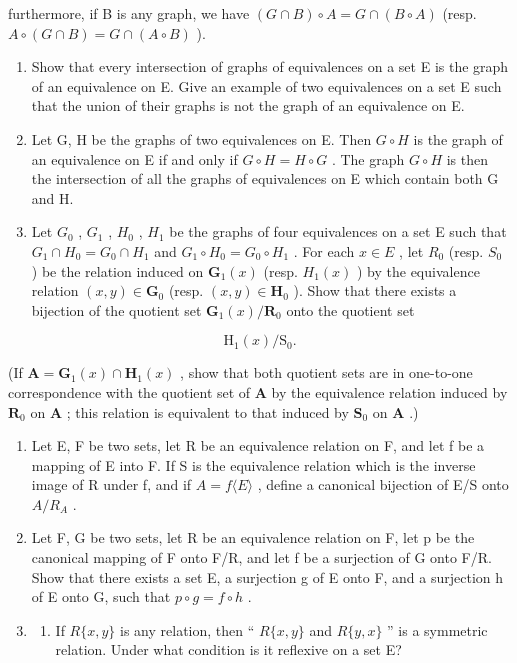 furthermore, if B is any graph, we have \((G \cap B) \circ A = G \cap (B \circ A)\) (resp. \(A \circ (G \cap B) = G \cap (A \circ B)\) ).

\begin{enumerate}
\def\labelenumi{\arabic{enumi}.}
\setcounter{enumi}{4}
\item
  Show that every intersection of graphs of equivalences on a set E is the graph of an equivalence on E. Give an example of two equivalences on a set E such that the union of their graphs is not the graph of an equivalence on E.
\item
  Let G, H be the graphs of two equivalences on E. Then \(G \circ H\) is the graph of an equivalence on E if and only if \(G \circ H = H \circ G\) . The graph \(G \circ H\) is then the intersection of all the graphs of equivalences on E which contain both G and H.
\item
  Let \(G_{0}\) , \(G_{1}\) , \(H_{0}\) , \(H_{1}\) be the graphs of four equivalences on a set E such that \(G_{1} \cap H_{0} = G_{0} \cap H_{1}\) and \(G_{1} \circ H_{0} = G_{0} \circ H_{1}\) . For each \(x \in E\) , let \(R_{0}\) (resp. \(S_{0}\) ) be the relation induced on \(\mathbf{G}_{1}(x)\) (resp. \(H_{1}(x)\) ) by the equivalence relation \((x, y) \in \mathbf{G}_{0}\) (resp. \((x, y) \in \mathbf{H}_{0}\) ). Show that there exists a bijection of the quotient set \(\mathbf{G}_{1}(x)/\mathbf{R}_{0}\) onto the quotient set
\end{enumerate}

\[
\mathrm{H} _ {1} (x) / \mathrm{S} _ {0}.
\]

(If \(\mathbf{A} = \mathbf{G}_1(x) \cap \mathbf{H}_1(x)\) , show that both quotient sets are in one-to-one correspondence with the quotient set of \(\mathbf{A}\) by the equivalence relation induced by \(\mathbf{R}_0\) on \(\mathbf{A}\) ; this relation is equivalent to that induced by \(\mathbf{S}_0\) on \(\mathbf{A}\) .)

\begin{enumerate}
\def\labelenumi{\arabic{enumi}.}
\setcounter{enumi}{7}
\item
  Let E, F be two sets, let R be an equivalence relation on F, and let f be a mapping of E into F. If S is the equivalence relation which is the inverse image of R under f, and if \(A = f \langle E \rangle\) , define a canonical bijection of E/S onto \(A/R_{A}\) .
\item
  Let F, G be two sets, let R be an equivalence relation on F, let p be the canonical mapping of F onto F/R, and let f be a surjection of G onto F/R. Show that there exists a set E, a surjection g of E onto F, and a surjection h of E onto G, such that \(p \circ g = f \circ h\) .
\item
  \begin{enumerate}
  \def\labelenumii{(\alph{enumii})}
  \tightlist
  \item
    If \(R\{x, y\}\) is any relation, then `` \(R\{x, y\}\) and \(R\{y, x\}\) '' is a symmetric relation. Under what condition is it reflexive on a set E?
  \end{enumerate}
\end{enumerate}

